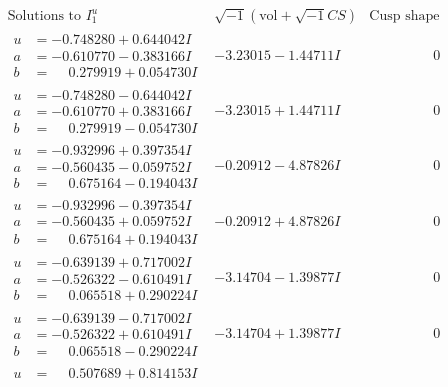 \documentclass[1p]{elsarticle_modified}
\theoremstyle{definition}
\newcommand{\I}{\sqrt{-1}}
\begin{document}
$$\begin{array}{c|c|c}  
\text{Solutions to }I^u_{1}& \I (\text{vol} + \sqrt{-1}CS) & \text{Cusp shape}\\
 \hline 
\begin{aligned}
u &= -0.748280 + 0.644042 I \\
a &= -0.610770 - 0.383166 I \\
b &= \phantom{-}0.279919 + 0.054730 I\end{aligned}
 & -3.23015 - 1.44711 I & \phantom{-0.000000 } 0 \\ \hline\begin{aligned}
u &= -0.748280 - 0.644042 I \\
a &= -0.610770 + 0.383166 I \\
b &= \phantom{-}0.279919 - 0.054730 I\end{aligned}
 & -3.23015 + 1.44711 I & \phantom{-0.000000 } 0 \\ \hline\begin{aligned}
u &= -0.932996 + 0.397354 I \\
a &= -0.560435 - 0.059752 I \\
b &= \phantom{-}0.675164 - 0.194043 I\end{aligned}
 & -0.20912 - 4.87826 I & \phantom{-0.000000 } 0 \\ \hline\begin{aligned}
u &= -0.932996 - 0.397354 I \\
a &= -0.560435 + 0.059752 I \\
b &= \phantom{-}0.675164 + 0.194043 I\end{aligned}
 & -0.20912 + 4.87826 I & \phantom{-0.000000 } 0 \\ \hline\begin{aligned}
u &= -0.639139 + 0.717002 I \\
a &= -0.526322 - 0.610491 I \\
b &= \phantom{-}0.065518 + 0.290224 I\end{aligned}
 & -3.14704 - 1.39877 I & \phantom{-0.000000 } 0 \\ \hline\begin{aligned}
u &= -0.639139 - 0.717002 I \\
a &= -0.526322 + 0.610491 I \\
b &= \phantom{-}0.065518 - 0.290224 I\end{aligned}
 & -3.14704 + 1.39877 I & \phantom{-0.000000 } 0 \\ \hline\begin{aligned}
u &= \phantom{-}0.507689 + 0.814153 I \\

\end{aligned}
\end{array}$$
\end{document}
